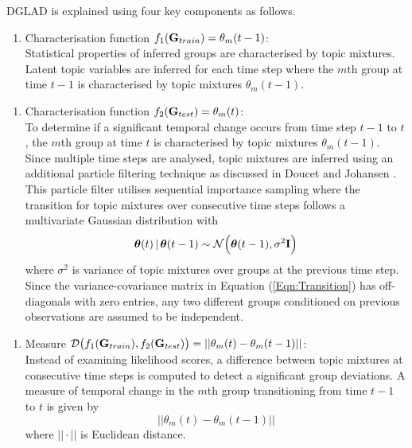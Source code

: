 DGLAD is explained using four key components as follows.  %
\begin{enumerate}[1.]
\item Characterisation function $f_1({\bf G}_{train})= \theta_m(t-1)$: \\ 
Statistical properties of inferred groups are characterised by topic mixtures.  Latent topic variables are inferred for  each time step where the $m$th group at time $t-1$ is characterised by topic mixtures ${\theta}_{m}(t-1)$. 
\end{enumerate}

 

  
\begin{enumerate}[2.]
\item Characterisation function $f_2({\bf G}_{test})=\theta_m(t)$: \\ 
To determine if a significant temporal change occurs from time step $t-1$ to $t$, the $m$th group at time $t$ is characterised by topic mixtures ${\theta}_{m}(t-1)$.  
  Since multiple time steps are analysed, topic mixtures %
 are inferred using an additional particle filtering technique as discussed in Doucet and Johansen \cite{doucet2009tutorial}. This particle filter utilises sequential importance sampling where the transition for topic mixtures over consecutive time steps follows  a multivariate Gaussian distribution with  
\begin{equation}
\boldsymbol\theta(t) \,| \, \boldsymbol\theta(t-1) \sim \mathcal{N} \Big(\boldsymbol\theta(t-1), \sigma^2 {\bf I} \Big)  \label{Eqn:Transition}
\end{equation}
where $\sigma^2$ is variance of topic mixtures over groups at the previous time step.  Since the variance-covariance matrix in Equation (\ref{Eqn:Transition}) has off-diagonals with zero entries, any two different groups conditioned on previous observations are assumed to be independent. 
\end{enumerate}
 
\begin{enumerate}[3.] 
\item Measure $ \mathcal{D}\big(f_1({\bf G}_{train}), f_2({\bf G}_{test})\big )= || \theta_m(t) -\theta_m(t-1) ||$: \\
Instead of examining likelihood scores, a difference between topic mixtures at consecutive time steps is computed to detect a significant group deviations.   A measure of temporal change in the $m$th group  transitioning from time $t-1$ to $t$ is given by 
\[ || \theta_m(t) -\theta_m(t-1) ||  \] 
where $|| \cdot ||$ is Euclidean distance. 
\end{enumerate}
 

